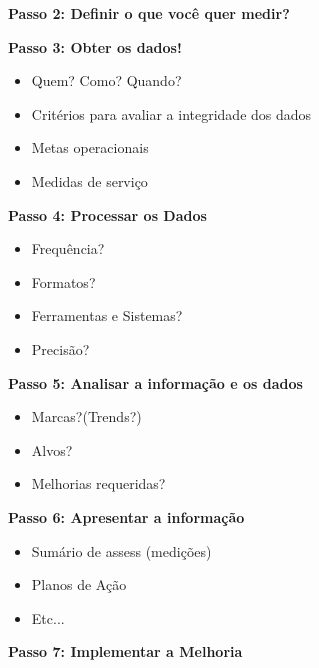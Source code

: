 \textbf{Passo 2: Definir o que você quer medir?}

\textbf{Passo 3: Obter os dados!}
\begin{itemize}
	\item Quem? Como? Quando?
	\item Critérios para avaliar a integridade dos dados
	\item Metas operacionais
	\item Medidas de serviço
\end{itemize}

\textbf{Passo 4: Processar os Dados}
\begin{itemize}
	\item Frequência?
	\item Formatos?
	\item Ferramentas e Sistemas?
	\item Precisão?
\end{itemize}

\textbf{Passo 5:  Analisar a informação e os dados}
\begin{itemize}
	\item Marcas?(Trends?)
	\item Alvos?
	\item Melhorias requeridas?
\end{itemize}

\textbf{Passo 6: Apresentar a informação}
\begin{itemize}
	\item Sumário de assess (medições)
	\item Planos de Ação
	\item Etc...
\end{itemize}

\textbf{Passo 7: Implementar a Melhoria}


